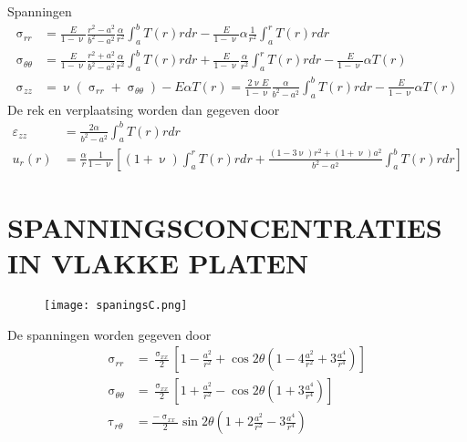             Spanningen
            \begin{align}
                \upsigma_{rr} &= \frac{E}{1-\upnu}\frac{r^2-a^2}{b^2-a^2}\frac{\alpha}{r^2}\int_a^bT(r)rdr-\frac{E}{1-\upnu}\alpha\frac{1}{r^2}\int_a^rT(r)rdr\nonumber\\
                \upsigma_{\theta\theta} &= \frac{E}{1-\upnu}\frac{r^2+a^2}{b^2-a^2}\frac{\alpha}{r^2}\int_a^bT(r)rdr+\frac{E}{1-\upnu}\frac{\alpha}{r^2}\int_a^rT(r)rdr-\frac{E}{1-\upnu}\alpha T(r)\\
                \upsigma_{zz} &= \upnu(\upsigma_{rr}+\upsigma_{\theta\theta}) - E\alpha T(r) = \frac{2\upnu E}{1-\upnu}\frac{\alpha}{b^2-a^2}\int_a^bT(r)rdr-\frac{E}{1-\upnu}\alpha T(r)\nonumber
            \end{align}
            De rek en verplaatsing worden dan gegeven door
            \begin{align}
                \varepsilon_{zz} &= \frac{2\alpha}{b^2-a^2}\int_a^bT(r)rdr\nonumber\\
                u_r(r) &= \frac{\alpha}{r}\frac{1}{1-\upnu}\left[(1+\upnu)\int_a^rT(r)rdr+\frac{(1-3\upnu)r^2+(1+\upnu)a^2}{b^2-a^2}\int_a^bT(r)rdr\right]
            \end{align}
    \section{SPANNINGSCONCENTRATIES IN VLAKKE PLATEN}

        \begin{figure}[h!]
            \centering
            \texttt{[image: spaningsC.png]}
        \end{figure}
        De spanningen worden gegeven door
        \begin{align}
            \upsigma_{rr} &= \frac{\upsigma_{xx}}{2}\left[1-\frac{a^2}{r^2}+\cos2\theta\left(1-4\frac{a^2}{r^2}+3\frac{a^4}{r^4}\right)\right]\nonumber\\
            \upsigma_{\theta\theta} &= \frac{\upsigma_{xx}}{2}\left[1+\frac{a^2}{r^2}-\cos2\theta\left(1+3\frac{a^4}{r^4}\right)\right]\\
            \uptau_{r\theta} &= \frac{-\upsigma_{xx}}{2}\sin2\theta\left(1+2\frac{a^2}{r^2}-3\frac{a^4}{r^4}\right)
        \end{align}


